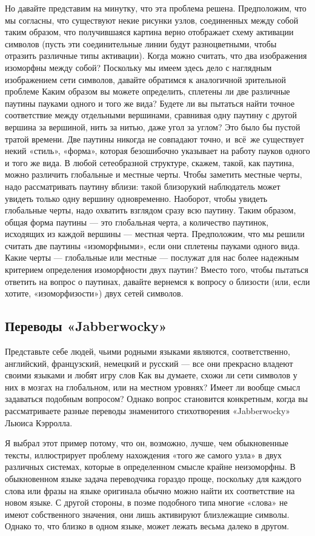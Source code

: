 \documentclass[../main.tex]{subfiles}
\begin{document}
Но давайте представим на минутку, что эта проблема решена. Предположим, что мы согласны, что существуют некие рисунки узлов, соединенных между собой таким образом, что получившаяся картина верно отображает схему активации символов (пусть эти соединительные линии будут разноцветными, чтобы отразить различные типы активации). Когда можно считать, что два изображения изоморфны между собой? Поскольку мы имеем здесь дело с наглядным изображением сети символов, давайте обратимся к аналогичной зрительной проблеме Каким образом вы можете определить, сплетены ли две различные паутины пауками одного и того же вида? Будете ли вы пытаться найти точное соответствие между отдельными вершинами, сравнивая одну паутину с другой вершина за вершиной, нить за нитью, даже угол за углом? Это было бы пустой тратой времени. Две паутины никогда не совпадают точно, и~всё~же существует некий «стиль», «форма», которая безошибочно указывает на работу пауков одного и того же вида. В любой сетеобразной структуре, скажем, такой, как паутина, можно различить глобальные и местные черты. Чтобы заметить местные черты, надо рассматривать паутину вблизи: такой близорукий наблюдатель может увидеть только одну вершину одновременно. Наоборот, чтобы увидеть глобальные черты, надо охватить взглядом сразу всю паутину. Таким образом, общая форма паутины --- это глобальная черта, а количество паутинок, исходящих из каждой вершины --- местная черта. Предположим, что мы решили считать две паутины «изоморфными», если они сплетены пауками одного вида. Какие черты --- глобальные или местные --- послужат для нас более надежным критерием определения изоморфности двух паутин? Вместо того, чтобы пытаться ответить на вопрос о паутинах, давайте вернемся к вопросу о близости (или, если хотите, «изоморфизости») двух сетей символов.


\subsection{Переводы «Jabberwocky»}

Представьте себе людей, чьими родными языками являются, соответственно, английский, французский, немецкий и русский --- все они прекрасно владеют своими языками и любят игру слов Как вы думаете, схожи ли сети символов у них в мозгах на глобальном, или на местном уровнях? Имеет ли вообще смысл задаваться подобным вопросом? Однако вопрос становится конкретным, когда вы рассматриваете разные переводы знаменитого стихотворения «Jabberwocky» Льюиса Кэрролла.

Я выбрал этот пример потому, что он, возможно, лучше, чем обыкновенные тексты, иллюстрирует проблему нахождения «того же самого узла» в двух различных системах, которые в определенном смысле крайне неизоморфны. В обыкновенном языке задача переводчика гораздо проще, поскольку для каждого слова или фразы на языке оригинала обычно можно найти их соответствие на новом языке. С другой стороны, в поэме подобного типа многие «слова» не имеют собственного значения, они лишь активируют близлежащие символы. Однако то, что близко в одном языке, может лежать весьма далеко в другом.
\end{document}
